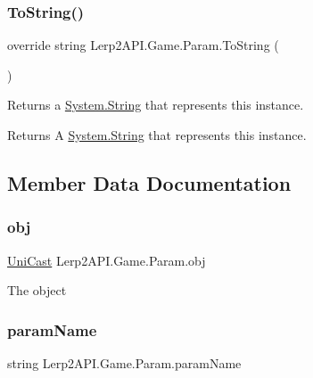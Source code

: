 \subsubsection{\texorpdfstring{To\+String()}{ToString()}}
{\footnotesize\ttfamily override string Lerp2\+A\+P\+I.\+Game.\+Param.\+To\+String (\begin{DoxyParamCaption}{ }\end{DoxyParamCaption})\hspace{0.3cm}{\ttfamily [inline]}}



Returns a \hyperlink{namespace_lerp2_a_p_i_1_1_game_a2f182da062f210cc43f341f6992ee293a27118326006d3829667a400ad23d5d98}{System.\+String} that represents this instance. 

\begin{DoxyReturn}{Returns}
A \hyperlink{namespace_lerp2_a_p_i_1_1_game_a2f182da062f210cc43f341f6992ee293a27118326006d3829667a400ad23d5d98}{System.\+String} that represents this instance.
\end{DoxyReturn}


\subsection{Member Data Documentation}
\mbox{\label{class_lerp2_a_p_i_1_1_game_1_1_param_a1574efce7c2c1d3b834d95a55dc99185}} 
\subsubsection{\texorpdfstring{obj}{obj}}
{\footnotesize\ttfamily \hyperlink{class_lerp2_a_p_i_1_1_game_1_1_uni_cast}{Uni\+Cast} Lerp2\+A\+P\+I.\+Game.\+Param.\+obj}



The object 

\mbox{\label{class_lerp2_a_p_i_1_1_game_1_1_param_ae34f6415c4b58bfc604466c2250ba05c}} 
\subsubsection{\texorpdfstring{param\+Name}{paramName}}
{\footnotesize\ttfamily string Lerp2\+A\+P\+I.\+Game.\+Param.\+param\+Name}



